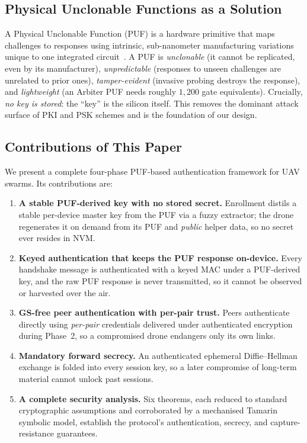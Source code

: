 \documentclass[11pt,a4paper]{article}
\begin{document}
\subsection{Physical Unclonable Functions as a Solution}

A Physical Unclonable Function (PUF) is a hardware primitive that maps
challenges to responses using intrinsic, sub-nanometer manufacturing
variations unique to one integrated circuit~\cite{puf_overview}. A PUF is
\emph{unclonable} (it cannot be replicated, even by its manufacturer),
\emph{unpredictable} (responses to unseen challenges are unrelated to prior
ones), \emph{tamper-evident} (invasive probing destroys the response), and
\emph{lightweight} (an Arbiter PUF needs roughly $1{,}200$ gate equivalents).
Crucially, \emph{no key is stored}: the ``key'' is the silicon itself. This
removes the dominant attack surface of PKI and PSK schemes and is the
foundation of our design.

\subsection{Contributions of This Paper}

We present a complete four-phase PUF-based authentication framework for UAV
swarms. Its contributions are:
\begin{enumerate}[leftmargin=*]
  \item \textbf{A stable PUF-derived key with no stored secret.} Enrollment
  distils a stable per-device master key from the PUF via a fuzzy extractor;
  the drone regenerates it on demand from its PUF and \emph{public} helper
  data, so no secret ever resides in NVM.
  \item \textbf{Keyed authentication that keeps the PUF response on-device.}
  Every handshake message is authenticated with a keyed MAC under a
  PUF-derived key, and the raw PUF response is never transmitted, so it cannot
  be observed or harvested over the air.
  \item \textbf{GS-free peer authentication with per-pair trust.} Peers
  authenticate directly using \emph{per-pair} credentials delivered under
  authenticated encryption during Phase~2, so a compromised drone endangers
  only its own links.
  \item \textbf{Mandatory forward secrecy.} An authenticated ephemeral
  Diffie--Hellman exchange is folded into every session key, so a later
  compromise of long-term material cannot unlock past sessions.
  \item \textbf{A complete security analysis.} Six theorems, each reduced to
  standard cryptographic assumptions and corroborated by a mechanised Tamarin
  symbolic model, establish the protocol's authentication, secrecy, and
  capture-resistance guarantees.
\end{enumerate}
\end{document}
